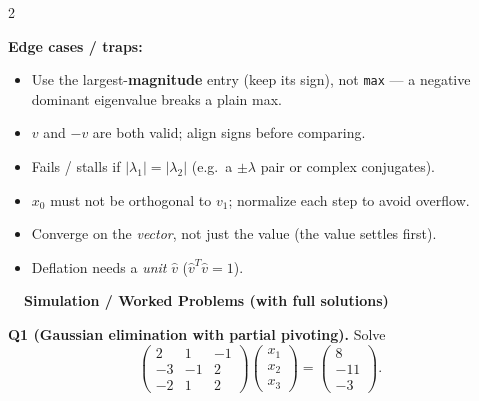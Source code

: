 \documentclass[10pt,a4paper]{article}
\newenvironment{edge}{\par{\color{warn}\textbf{Edge cases / traps:}}\begingroup\color{warn!85!black}\begin{itemize}[leftmargin=1.2em]}{\end{itemize}\endgroup}
\begin{document}
\begin{multicols}{2}
\begin{edge}
\item Use the largest-\textbf{magnitude} entry (keep its sign), not \texttt{max} — a negative dominant eigenvalue breaks a plain max.
\item $v$ and $-v$ are both valid; align signs before comparing.
\item Fails / stalls if $|\lambda_1|=|\lambda_2|$ (e.g.\ a $\pm\lambda$ pair or complex conjugates).
\item $x_0$ must not be orthogonal to $v_1$; normalize each step to avoid overflow.
\item Converge on the \emph{vector}, not just the value (the value settles first).
\item Deflation needs a \emph{unit} $\hat v$ ($\hat v^T\hat v=1$).
\end{edge}

\end{multicols}

\vspace{4pt}
\begin{center}\colorbox{hdr}{\parbox{\dimexpr\linewidth-2\fboxsep}{\color{white}\bfseries\large\ \ Simulation / Worked Problems (with full solutions)}}\end{center}
\vspace{4pt}

\textbf{Q1 (Gaussian elimination with partial pivoting).} Solve
\[ \begin{pmatrix} 2&1&-1\\ -3&-1&2\\ -2&1&2 \end{pmatrix}
\begin{pmatrix}x_1\\x_2\\x_3\end{pmatrix}=\begin{pmatrix}8\\-11\\-3\end{pmatrix}. \]
\end{document}
